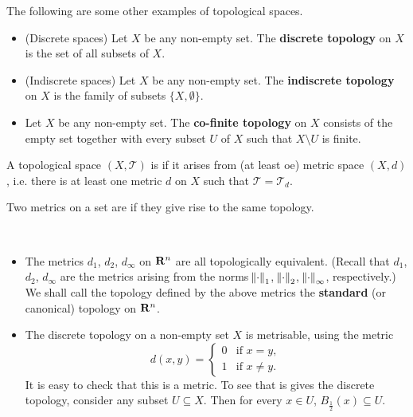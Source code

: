 \begin{example}
The following are some other examples of topological spaces.
\begin{itemize}
\item (Discrete spaces) Let $X$ be any non-empty set. The \textbf{discrete topology} on $X$ is
the set of all subsets of $X$.
\item (Indiscrete spaces) Let $X$ be any non-empty set. The \textbf{indiscrete topology} on $X$ is the family of subsets $\{X,\emptyset\}$.
\item Let $X$ be any non-empty set. The \textbf{co-finite topology} on $X$ consists of the empty set together with every subset $U$ of $X$ such that $X\setminus U$ is finite.
\end{itemize}
\end{example}

\begin{definition}
A topological space $(X,\mathcal{T})$ is  if it arises from (at least oe) metric space $(X,d)$, i.e. there is at least one metric $d$ on $X$ such that $\mathcal{T}=\mathcal{T}_d$.
\end{definition}

\begin{definition}
Two metrics on a set are  if they give rise to the same topology.
\end{definition}

\begin{example} \
\begin{itemize}
\item The metrics $d_1$, $d_2$, $d_\infty$ on $\mathbf R^n$ are all topologically equivalent. (Recall that $d_1$, $d_2$, $d_\infty$ are the metrics arising from the norms $\norm{\cdot}_1$, $\norm{\cdot}_2$, $\norm{\cdot}_\infty$, respectively.)
We shall call the topology defined by the above metrics the \textbf{standard} (or canonical) topology on $\mathbf R^n$.
\item The discrete topology on a non-empty set $X$ is metrisable, using the metric
\[d(x,y)=\begin{cases}
0&\text{if }x=y,\\
1&\text{if }x\neq y.
\end{cases}\]
It is easy to check that this is a metric. To see that is gives the discrete topology, consider any subset $U\subseteq X$. Then for every $x\in U$, $B_\frac{1}{2}(x)\subseteq U$.
\end{itemize}
\end{example}

